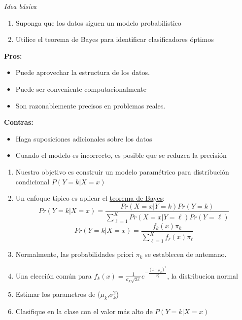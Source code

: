 \documentclass[
]{article}
\providecommand{\tightlist}{%
  \setlength{\itemsep}{0pt}\setlength{\parskip}{0pt}}
\begin{document}
\emph{Idea básica}

\begin{enumerate}
\def\labelenumi{\arabic{enumi}.}
\tightlist
\item
  Suponga que los datos siguen un modelo probabilístico
\item
  Utilice el teorema de Bayes para identificar clasificadores óptimos
\end{enumerate}

\textbf{Pros: }

\begin{itemize}
\tightlist
\item
  Puede aprovechar la estructura de los datos.
\item
  Puede ser conveniente computacionalmente
\item
  Son razonablemente precisos en problemas reales.
\end{itemize}

\textbf{Contras:}

\begin{itemize}
\tightlist
\item
  Haga suposiciones adicionales sobre los datos
\item
  Cuando el modelo es incorrecto, es posible que se reduzca la precisión
\end{itemize}

\begin{enumerate}
\def\labelenumi{\arabic{enumi}.}
\item
  Nuestro objetivo es construir un modelo paramétrico para distribución
  condicional \(P(Y = k | X = x)\)
\item
  Un enfoque típico es aplicar el
  \href{http://en.wikipedia.org/wiki/Bayes'_theorem}{teorema de Bayes}:
  \[Pr(Y = k | X=x) = \frac{Pr(X=x|Y=k)Pr(Y=k)}{\sum_{\ell=1}^K Pr(X=x |Y = \ell) Pr(Y=\ell)}\]
  \[Pr(Y = k | X=x) = \frac{f_k(x) \pi_k}{\sum_{\ell = 1}^K f_{\ell}(x) \pi_{\ell}}\]
\item
  Normalmente, las probabilidades priori \(\pi_k\) se establecen de
  antemano.
\item
  Una elección común para
  \(f_k(x) = \frac{1}{\sigma_k \sqrt{2 \pi}}e^{-\frac{(x-\mu_k)^2}{\sigma_k^2}}\),
  la distribucion normal
\item
  Estimar los parametros de (\(\mu_k\),\(\sigma_k^2\))
\item
  Clasifique en la clase con el valor más alto de \(P(Y = k | X = x)\)
\end{enumerate}
\end{document}
